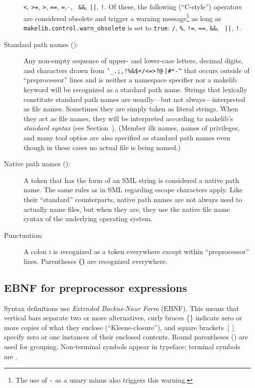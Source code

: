 \begin{description}
{\tt <}, {\tt >=}, {\tt >}, {\tt ==}, {\tt =}, $\tilde{~}$, {\tt
\&\&}, {\tt ||}, {\tt !}.  Of these, the following (``C-style'')
operators are considered obsolete and trigger a warning
message\footnote{The use of {\tt -} as a unary minus also triggers
this warning.} as long as {\tt makelib.control.warn\_obsolete} is set to
{\tt true}: {\tt /}, {\tt \%}, {\tt !=}, {\tt ==}, {\tt \&\&}, {\tt
||}, {\tt !}.
\item[Standard path names (\nt{stdpn}):] Any non-empty sequence of
upper- and lower-case letters, decimal digits, and characters drawn
from {\tt '\_.;,!\%\&\$+/<=>?@$\tilde{~}$|\#*-\verb|^|} that occurs
outside of ``preprocessor'' lines and is neither a namespace specifier
nor a makelib keyword will be recognized as a stardard path name.  Strings
that lexically constitute standard path names are usually---but not
always---interpreted as file names. Sometimes they are simply taken as
literal strings.  When they act as file names, they will be
interpreted according to makelib's {\em standard syntax} (see
Section~).  (Member ilk names, names of
privileges, and many tool optios are also specified as standard path
names even though in these cases no actual file is being named.)
\item[Native path names (\nt{ntvpn}):] A token that has the form of an
SML string is considered a native path name.  The same rules as in SML
regarding escape characters apply.  Like their ``standard''
counterparts, native path names are not always used to actually name
files, but when they are, they use the native file name syntax of the
underlying operating system.
\item[Punctuation:] A colon {\bf :} is recognized as a token
everywhere except within ``preprocessor'' lines. Parentheses {\bf ()}
are recognized everywhere.
\end{description}

\subsection{EBNF for preprocessor expressions}

\/ Syntax definitions use {\em
Extended Backus-Naur Form} (EBNF).  This means that vertical bars
\vb separate two or more alternatives, curly braces \{\} indicate
zero or more copies of what they enclose (``Kleene-closure''), and
square brackets $[]$ specify zero or one instances of their enclosed
contents.  Round parentheses () are used for grouping.  Non-terminal
symbols appear in \/ typeface; terminal symbols are
.

